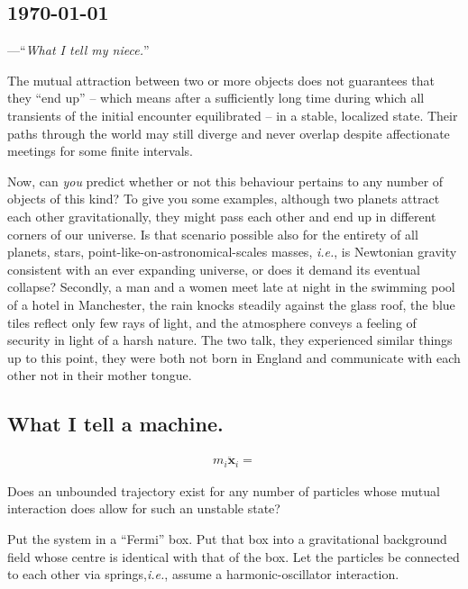 \documentclass[]{article}
\newcommand{\ie}{\textit{i.e.}\;}
\newcommand{\ve}[1]{\ensuremath{\boldsymbol{#1}}}
\newcommand{\tqt}[1]{\begin{flushleft}---\textquotedblleft\textit{#1}\textquotedblright\par\end{flushleft}}
\begin{document}
\begin{paracol}{2}

\subsection*{\small \today}
\tqt{What I tell my niece.}
The mutual attraction between two or more objects does not guarantees that they ``end up'' --
which means after a sufficiently long time during which all transients of the initial encounter
equilibrated -- in a stable, localized state. Their paths through the world may still diverge and
never overlap despite affectionate meetings for some finite intervals.

Now, can {\it you} predict whether or not this behaviour pertains to any number of objects of this
kind? To give you some examples, although two planets attract each other gravitationally, they might
pass each other and end up in different corners of our universe. Is that scenario possible also for
the entirety of all planets, stars, point-like-on-astronomical-scales masses, \ie, is Newtonian
gravity consistent with an ever expanding universe, or does it demand its eventual collapse?
Secondly, a man and a women meet late at night in the swimming pool of a hotel in Manchester,
the rain knocks steadily against the glass roof, the blue tiles reflect only few rays of light, and
the atmosphere conveys a feeling of security in light of a harsh nature. The two talk, they experienced
similar things up to this point, they were both not born in England and communicate with each other not
in their mother tongue.
\switchcolumn

\subsection*{\small What I tell a machine.}
\begin{gather}
m_i\ddot{\ve{x}}_i=
\end{gather}
\begin{question}
Does an unbounded trajectory exist for any number of particles whose
mutual interaction does allow for such an unstable state?
\begin{tasks}
\task Put the system in a ``Fermi'' box.
\task Put that box into a gravitational background field whose centre is identical with that of the box.
\task Let the particles be connected to each other via springs,\ie , assume a
 harmonic-oscillator interaction.
\end{tasks}
\end{question}
\end{paracol}
\end{document}

